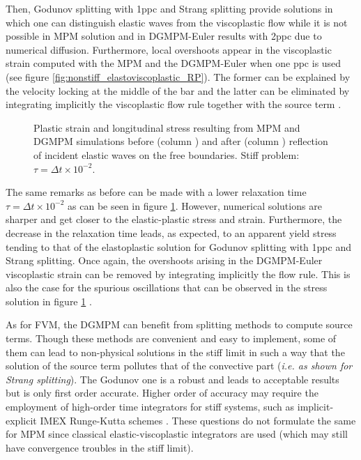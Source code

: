 Then, Godunov splitting with 1ppc and Strang splitting provide solutions in which one can distinguish elastic waves from the viscoplastic flow while it is not possible in MPM solution and in DGMPM-Euler results with 2ppc due to numerical diffusion.
Furthermore, local overshoots appear in the viscoplastic strain computed with the MPM and the DGMPM-Euler when one ppc is used (see figure \ref{fig:nonstiff_elastoviscoplastic_RP}). 
The former can be explained by the velocity locking at the middle of the bar and the latter can be eliminated by integrating implicitly the viscoplastic flow rule together with the source term \cite{Thomas_EVP}.
\begin{figure}[h!]
  \centering
  { \label{subfig:evp_stiff1}}
  { \label{subfig:evp_stiff3}}
  {}
  \caption{Plastic strain and longitudinal stress resulting from MPM and DGMPM simulations before (column ) and after (column ) reflection of incident elastic waves on the free boundaries. Stiff problem: $\tau=\Delta t \times 10^{-2}$.}
  \label{fig:siff_elastoviscoplastic_RP}
\end{figure}

The same remarks as before can be made with a lower relaxation time $\tau=\Delta t \times 10^{-2}$ as can be seen in figure \ref{fig:siff_elastoviscoplastic_RP}. However, numerical solutions are sharper and get closer to the elastic-plastic stress and strain.
Furthermore, the decrease in the relaxation time leads, as expected, to an apparent yield stress tending to that of the elastoplastic solution for Godunov splitting with 1ppc and Strang splitting.
Once again, the overshoots arising in the DGMPM-Euler viscoplastic strain can be removed by integrating implicitly the flow rule. This is also the case for the spurious oscillations that can be observed in the stress solution in figure \ref{fig:siff_elastoviscoplastic_RP} \cite{Thomas_EVP}. 


As for FVM, the DGMPM can benefit from splitting methods to compute source terms.
Though these methods are convenient and easy to implement, some of them can lead to non-physical solutions in the stiff limit in such a way that the solution of the source term pollutes that of the convective part (\textit{i.e. as shown for Strang splitting}).
The Godunov one is a robust and leads to acceptable results but is only first order accurate.
Higher order of accuracy may require the employment of high-order time integrators for stiff systems, such as implicit-explicit IMEX Runge-Kutta schemes \cite{Pareschi_stiff}.
These questions do not formulate the same for MPM since classical elastic-viscoplastic integrators are used (which may still have convergence troubles in the stiff limit).

